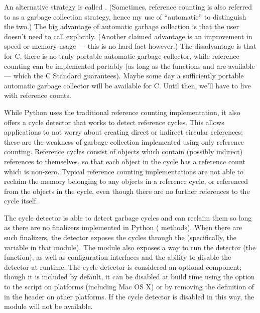 An alternative strategy is called .
(Sometimes, reference counting is also referred to as a garbage
collection strategy, hence my use of ``automatic'' to distinguish the
two.)  The big advantage of automatic garbage collection is that the
user doesn't need to call  explicitly.  (Another claimed
advantage is an improvement in speed or memory usage --- this is no
hard fact however.)  The disadvantage is that for C, there is no
truly portable automatic garbage collector, while reference counting
can be implemented portably (as long as the functions 
and  are available --- which the C Standard guarantees).
Maybe some day a sufficiently portable automatic garbage collector
will be available for C.  Until then, we'll have to live with
reference counts.

While Python uses the traditional reference counting implementation,
it also offers a cycle detector that works to detect reference
cycles.  This allows applications to not worry about creating direct
or indirect circular references; these are the weakness of garbage
collection implemented using only reference counting.  Reference
cycles consist of objects which contain (possibly indirect) references
to themselves, so that each object in the cycle has a reference count
which is non-zero.  Typical reference counting implementations are not
able to reclaim the memory belonging to any objects in a reference
cycle, or referenced from the objects in the cycle, even though there
are no further references to the cycle itself.

The cycle detector is able to detect garbage cycles and can reclaim
them so long as there are no finalizers implemented in Python
( methods).  When there are such finalizers, the
detector exposes the cycles through the  (specifically, the 
variable in that module).  The  module also exposes a way
to run the detector (the  function), as well as
configuration interfaces and the ability to disable the detector at
runtime.  The cycle detector is considered an optional component;
though it is included by default, it can be disabled at build time
using the  option to the
 script on \UNIX{} platforms (including Mac OS X)
or by removing the definition of  in the
 header on other platforms.  If the cycle detector is
disabled in this way, the  module will not be available.


